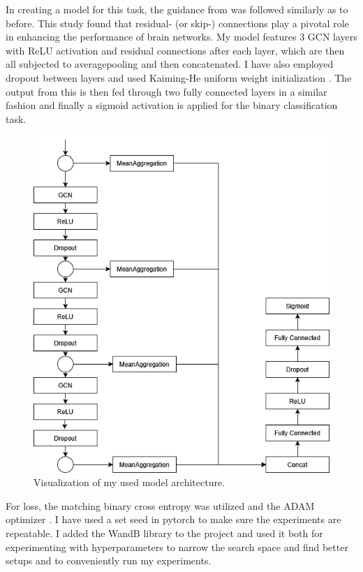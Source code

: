 	In creating a model for this task, the guidance from \cite{said2023neurograph} was followed similarly as to before. This study found that residual- (or skip-) connections play a pivotal role in enhancing the performance of brain networks. My model features 3 GCN layers with ReLU activation and residual connections after each layer, which are then all subjected to averagepooling and then concatenated. I have also employed dropout between layers and used Kaiming-He uniform weight initialization \cite{he2015delving}. The output from this is then fed through two fully connected layers in a similar fashion and finally a sigmoid activation is applied for the binary classification task. 
	
	\begin{figure}[!h]
		\centering
		\includegraphics[width=\textwidth]{figures/model.png}
		\caption{Visualization of my used model architecture.}
		\label{fig:model}
	\end{figure}
	
	For loss, the matching binary cross entropy was utilized and the ADAM optimizer \cite{kingma2014adam}. I have used a set seed in pytorch to make sure the experiments are repeatable. I added the WandB library to the project and used it both for experimenting with hyperparameters to narrow the search space and find better setups and to conveniently run my experiments.
	
